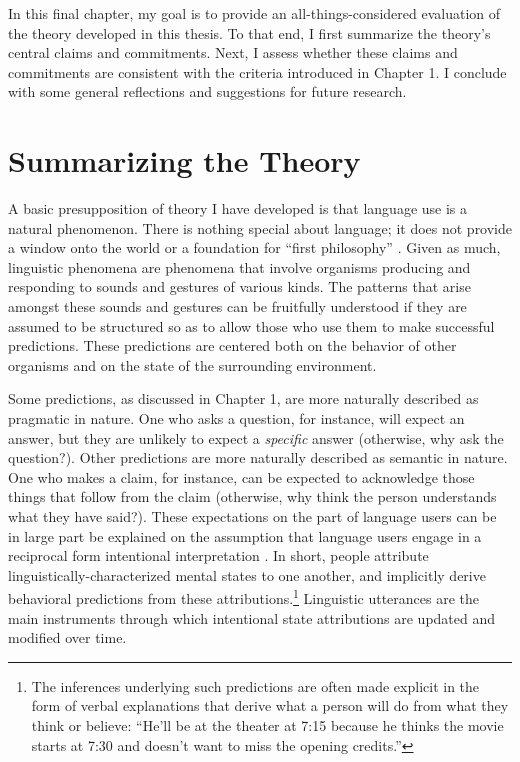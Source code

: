 In this final chapter, my goal is to provide an all-things-considered evaluation of the theory developed in this thesis. To that end, I first summarize the theory's central claims and commitments. Next, I assess whether these claims and commitments are consistent with the criteria introduced in Chapter 1. I conclude with some general reflections and suggestions for future research.  

\section{Summarizing the Theory}

A basic presupposition of theory I have developed is that language use is a natural phenomenon. There is nothing special about language; it does not provide a window onto the world or a foundation for ``first philosophy'' \citep[see][]{Stanley:2008}. Given as much, linguistic phenomena are phenomena that involve organisms producing and responding to sounds and gestures of various kinds. The patterns that arise amongst these sounds and gestures can be fruitfully understood if they are assumed to be structured so as to allow those who use them to make successful predictions. These predictions are centered both on the behavior of other organisms and on the state of the surrounding environment. 

Some predictions, as discussed in Chapter 1, are more naturally described as pragmatic in nature. One who asks a question, for instance, will expect an answer, but they are unlikely to expect a \textit{specific} answer (otherwise, why ask the question?). Other predictions are more naturally described as semantic in nature. One who makes a claim, for instance, can be expected to acknowledge those things that follow from the claim (otherwise, why think the person understands what they have said?). These expectations on the part of language users can be in large part be explained on the assumption that language users engage in a reciprocal form intentional interpretation \citep{Brandom:1994,Dennett:1987}. In short, people attribute linguistically-characterized mental states to one another, and implicitly derive behavioral predictions from these attributions.\footnote{The inferences underlying such predictions are often made explicit in the form of verbal explanations that derive what a person will do from what they think or believe: ``He'll be at the theater at 7:15 because he thinks the movie starts at 7:30 and doesn't want to miss the opening credits.''} Linguistic utterances are the main instruments through which intentional state attributions are updated and modified over time. 

